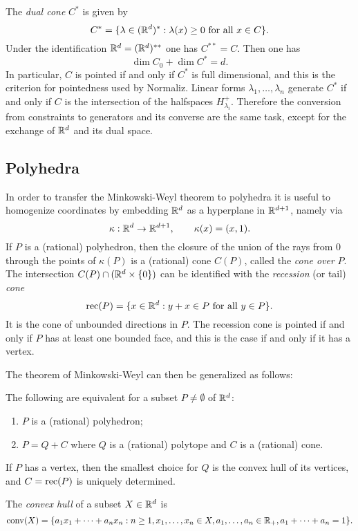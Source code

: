 The \emph{dual cone} $C^*$ is given by
$$
C^*=\{\lambda\in ({\mathbb R}^d)^*:\lambda(x)\ge0 \text{ for all } x\in C\}.
$$
Under the identification ${\mathbb R}^d=({\mathbb R}^d)^{**}$ one has $C^{**}=C$. Then one has
$$
\dim C_0+\dim C^*=d.
$$
In particular, $C$ is pointed if and only if $C^*$ is full dimensional, and this is the criterion for pointedness used by Normaliz. Linear forms $\lambda_1,\dots,\lambda_n$ generate $C^*$ if and only if $C$ is the intersection of the halfspaces $H_{\lambda_i}^+$. Therefore the conversion from constraints to generators and its converse are the same task, except for the exchange of ${\mathbb R}^d$ and its dual space.

\subsection{Polyhedra}

In order to transfer the Minkowski-Weyl theorem to polyhedra it is useful to homogenize coordinates by embedding ${\mathbb R}^d$ as a hyperplane in ${\mathbb R}^{d+1}$, namely via
$$
\kappa:{\mathbb R}^d\to{\mathbb R}^{d+1},\qquad \kappa(x)=(x,1).
$$
If $P$ is a (rational) polyhedron, then the closure of the union of the rays from $0$ through the points of $\kappa(P)$ is a (rational) cone $C(P)$, called the \emph{cone over} $P$. The intersection $C(P)\cap({\mathbb R}^d\times\{0\})$ can be identified with the \emph{recession} (or tail) \emph{cone}
$$
\operatorname{rec}(P)=\{x\in{\mathbb R}^d: y+x\in P\text{ for all } y\in P\}.
$$
It is the cone of unbounded directions in $P$. The recession cone is pointed if and only if $P$ has at least one bounded face, and this is the case if and only if it has a vertex.

The theorem of Minkowski-Weyl can then be generalized as follows:

\begin{theorem}[Motzkin]
	The following are equivalent for a subset $P\neq\emptyset$ of ${\mathbb R}^d$:
	\begin{enumerate}
		\item $P$ is a (rational) polyhedron;
		\item $P=Q+C$ where $Q$ is a (rational) polytope and $C$ is a (rational) cone.
	\end{enumerate}
	If $P$ has a vertex, then the smallest choice for $Q$ is the convex hull of its vertices, and $C=\operatorname{rec}(P)$ is uniquely determined.
\end{theorem}

The \emph{convex hull} of a subset $X\in{\mathbb R}^d$ is
$$
\operatorname{conv}(X)=\{a_1x_1+\dots+a_nx_n: n\ge 1, x_1,\dots,x_n\in X, a_1,\dots,a_n\in{\mathbb R}_+, a_1+\dots+a_n=1\}.
$$

